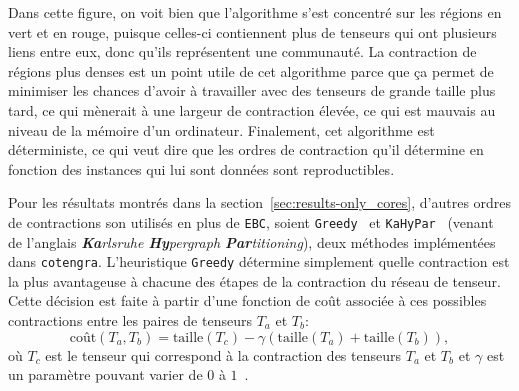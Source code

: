 Dans cette figure, on voit bien que l'algorithme s'est concentré sur les régions en vert et en rouge, puisque celles-ci contiennent plus de tenseurs qui ont plusieurs liens entre eux, donc qu'ils représentent une communauté.
La contraction de régions plus denses est un point utile de cet algorithme parce que ça permet de minimiser les chances d'avoir à travailler avec des tenseurs de grande taille plus tard, ce qui mènerait à une largeur de contraction élevée, ce qui est mauvais au niveau de la mémoire d'un ordinateur.
Finalement, cet algorithme est déterministe, ce qui veut dire que les ordres de contraction qu'il détermine en fonction des instances qui lui sont données sont reproductibles.

Pour les résultats montrés dans la section~\ref{sec:results-only_cores}, d'autres ordres de contractions son utilisés en plus de \verb|EBC|, soient \verb|Greedy|~\cite{gray_hyper-optimized_2021} et \verb|KaHyPar|~\cite{PhDThesis-kahypar,paper-kahypar} (venant de l'anglais \textit{\textbf{Ka}rlsruhe \textbf{Hy}pergraph \textbf{Par}titioning}), deux méthodes implémentées dans \verb|cotengra|.
L'heuristique \verb|Greedy| détermine simplement quelle contraction est la plus avantageuse à chacune des étapes de la contraction du réseau de tenseur.
Cette décision est faite à partir d'une fonction de coût associée à ces possibles contractions entre les paires de tenseurs $T_a$ et $T_b$: 
\begin{equation}\label{eq:greedy-cost-function}
    \mathrm{coût}(T_a, T_b) = \mathrm{taille}(T_c) - \gamma(\mathrm{taille}(T_a) + \mathrm{taille}(T_b)),
\end{equation}
où $T_c$ est le tenseur qui correspond à la contraction des tenseurs $T_a$ et $T_b$ et $\gamma$ est un paramètre pouvant varier de $0$ à $1$~\cite{gray_hyper-optimized_2021}.
